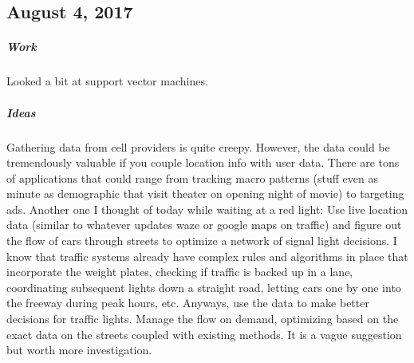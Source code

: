 \documentclass[a4paper]{article}
\begin{document}
\subsection{August 4, 2017}
\subparagraph{Work}
Looked a bit at support vector machines.
\subparagraph{Ideas}
Gathering data from cell providers is quite creepy. However, the data could be tremendously valuable if you couple location info with user data. There are tons of applications that could range from tracking macro patterns (stuff even as minute as demographic that visit theater on opening night of movie) to targeting ads. Another one I thought of today while waiting at a red light: Use live location data (similar to whatever updates waze or google maps on traffic) and figure out the flow of cars through streets to optimize a network of signal light decisions. I know that traffic systems already have complex rules and algorithms in place that incorporate the weight plates, checking if traffic is backed up in a lane, coordinating subsequent lights down a straight road, letting cars one by one into the freeway during peak hours, etc. Anyways, use the data to make better decisions for traffic lights. Manage the flow on demand, optimizing based on the exact data on the streets coupled with existing methods. It is a vague suggestion but worth more investigation.
\end{document}
